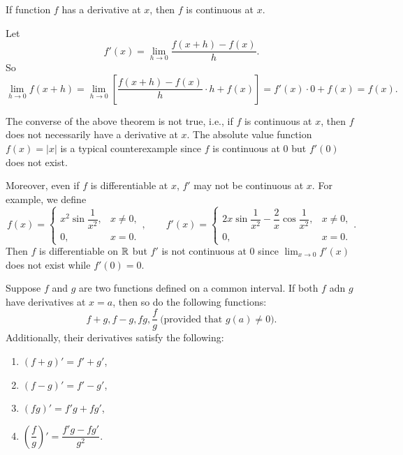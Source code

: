 	\begin{theoremenv}
		If function $f$ has a derivative at $x$, then $f$ is continuous at $x$.
	\end{theoremenv}
	\begin{proofenv}
		Let
		\[
		f'(x)=\lim_{h\to 0} \frac{f(x+h)-f(x)}{h}.
		\]
		So
		\[
		\lim_{h\to 0} f(x+h) = \lim_{h\to 0} \left[ \frac{f(x+h)-f(x)}{h} \cdot h + f(x) \right] = f'(x)\cdot 0 + f(x) = f(x).
		\]
	\end{proofenv}
    \begin{remarkenv}
        The converse of the above theorem is not true, i.e., if $f$ is continuous at $x$, then $f$ does not necessarily have a derivative at $x$. The absolute value function $f(x)=|x|$ is a typical counterexample since $f$ is continuous at $0$ but $f'(0)$ does not exist.

        Moreover, even if $f$ is differentiable at $x$, $f'$ may not be continuous at $x$. For example, we define
        $$
        f(x)=
        \begin{cases}
        x^2\sin\dfrac{1}{x^2}, & x\ne 0,\\[6pt]
        0, & x=0.
        \end{cases},\qquad
        f'(x)= \begin{cases}
            2x\sin\dfrac{1}{x^2}-\dfrac{2}{x}\cos\dfrac{1}{x^2}, & x\ne 0,\\[6pt]
            0, & x=0.
        \end{cases}.
        $$
        Then $f$ is differentiable on $\mathbb{R}$ but $f'$ is not continuous at $0$ since $\displaystyle\lim_{x\to 0} f'(x)$ does not exist while $f'(0)=0$.
    \end{remarkenv}
	\begin{theoremenv}
		Suppose $f$ and $g$ are two functions defined on a common interval. If both $f$ adn $g$ have derivatives at $x=a$, then so do the following functions:
		\[
		f+g,f-g,fg, \frac{f}{g}\ \text{(provided that $g(a)\neq 0$)}.
		\]
		Additionally, their derivatives satisfy the following:
		\begin{enumerate}
			\item[(1)] $(f+g)'=f'+g'$,
			\item[(2)] $(f-g)'=f'-g'$,
			\item[(3)] $(fg)'=f'g+fg'$,
			\item[(4)] $\left(\dfrac{f}{g}\right)'=\dfrac{f'g-fg'}{g^2}$.
		\end{enumerate}
	\end{theoremenv}
